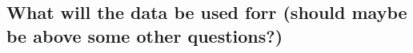 





\subsection{What will the data be used forr (should maybe be above some other questions?)}



